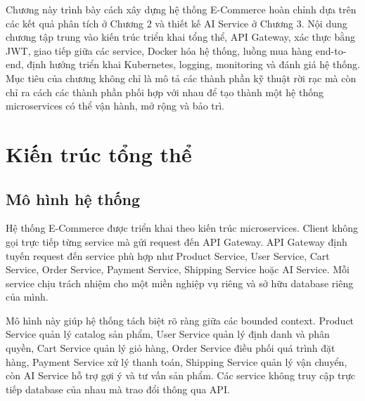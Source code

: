 \documentclass[../main.tex]{subfiles}
\begin{document}
Chương này trình bày cách xây dựng hệ thống E-Commerce hoàn chỉnh dựa trên các kết quả phân tích ở Chương 2 và thiết kế AI Service ở Chương 3. Nội dung chương tập trung vào kiến trúc triển khai tổng thể, API Gateway, xác thực bằng JWT, giao tiếp giữa các service, Docker hóa hệ thống, luồng mua hàng end-to-end, định hướng triển khai Kubernetes, logging, monitoring và đánh giá hệ thống. Mục tiêu của chương không chỉ là mô tả các thành phần kỹ thuật rời rạc mà còn chỉ ra cách các thành phần phối hợp với nhau để tạo thành một hệ thống microservices có thể vận hành, mở rộng và bảo trì.

\section{Kiến trúc tổng thể}
\label{section:4.1}

\subsection{Mô hình hệ thống}
\label{subsection:4.1.1}

Hệ thống E-Commerce được triển khai theo kiến trúc microservices. Client không gọi trực tiếp từng service mà gửi request đến API Gateway. API Gateway định tuyến request đến service phù hợp như Product Service, User Service, Cart Service, Order Service, Payment Service, Shipping Service hoặc AI Service. Mỗi service chịu trách nhiệm cho một miền nghiệp vụ riêng và sở hữu database riêng của mình.

Mô hình này giúp hệ thống tách biệt rõ ràng giữa các bounded context. Product Service quản lý catalog sản phẩm, User Service quản lý định danh và phân quyền, Cart Service quản lý giỏ hàng, Order Service điều phối quá trình đặt hàng, Payment Service xử lý thanh toán, Shipping Service quản lý vận chuyển, còn AI Service hỗ trợ gợi ý và tư vấn sản phẩm. Các service không truy cập trực tiếp database của nhau mà trao đổi thông qua API.
\end{document}
